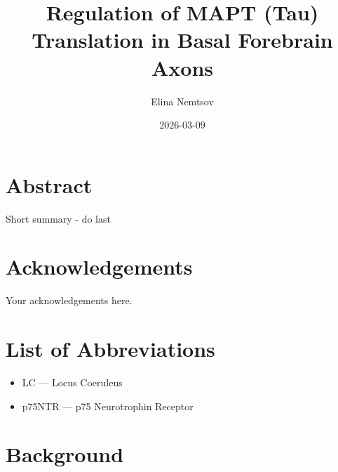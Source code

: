 \documentclass[
  letterpaper,
  DIV=11,
  numbers=noendperiod]{scrreprt}
\title{Regulation of MAPT (Tau) Translation in Basal Forebrain Axons}
\author{Elina Nemtsov}
\date{2026-03-09}
\providecommand{\tightlist}{%
  \setlength{\itemsep}{0pt}\setlength{\parskip}{0pt}}
\renewcommand*\contentsname{Table of contents}
\newcommand\contentsname{Table of contents}
\begin{document}
\maketitle

\renewcommand*\contentsname{Table of contents}
{
\hypersetup{linkcolor=}
\setcounter{tocdepth}{2}
\tableofcontents
}


\chapter{}\label{section}


\chapter*{Abstract}\label{abstract}


Short summary - do last


\chapter*{Acknowledgements}\label{acknowledgements}


Your acknowledgements here.


\chapter*{List of Abbreviations}\label{list-of-abbreviations}


\begin{itemize}
\tightlist
\item
  LC --- Locus Coeruleus
\item
  p75NTR --- p75 Neurotrophin Receptor
\end{itemize}


\chapter{Background}\label{background}
\end{document}
